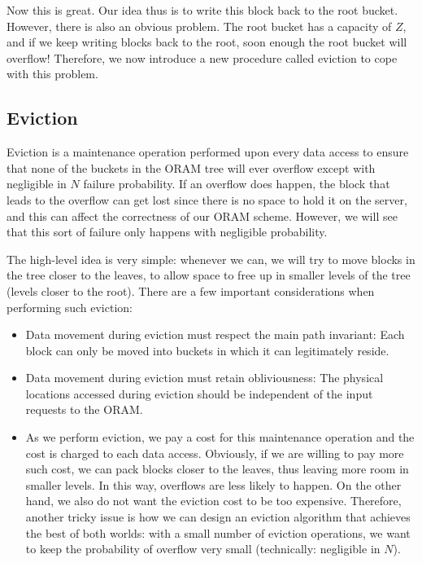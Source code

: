 Now this is great. Our idea thus is to write this block back to the root
bucket. However, there is also an obvious problem. The root bucket has a
capacity of $Z$, and if we keep writing blocks back to the root, soon
enough the root bucket will overflow! Therefore, we now introduce a new
procedure called \alert{eviction} to cope with this problem.

\subsection{Eviction}\label{eviction.}

Eviction is a maintenance operation performed upon every data access to
ensure that none of the buckets in the ORAM tree will ever overflow
except with negligible in $N$ failure probability. If an
overflow does happen, the block that leads to the overflow can get lost
since there is no space to hold it on the server, and this can affect
the correctness of our ORAM scheme. However, we will see that this sort of failure
only happens with negligible probability.

The high-level idea is very simple: whenever we can, we will try to move
blocks in the tree closer to the leaves, to allow space to free up in
smaller levels of the tree (levels closer to the root). There are a few
important considerations when performing such eviction:

\begin{itemize}
\item
  Data movement during eviction must respect the main path invariant:
  Each block can only be moved into buckets in which it can legitimately
  reside.
\item
  Data movement during eviction must retain \alert{obliviousness}: The
  physical locations accessed during eviction should be independent of
  the input requests to the ORAM.
\item
  As we perform eviction, we pay a cost for this maintenance operation
  and the cost is charged to each data access. Obviously, if we are
  willing to pay more such cost, we can pack blocks closer to the
  leaves, thus leaving more room in smaller levels. In this way,
  overflows are less likely to happen. On the other hand, we also do not
  want the eviction cost to be too expensive. Therefore, another tricky
  issue is how we can design an eviction algorithm that achieves the
  best of both worlds: with a small number of eviction operations, we
  want to keep the probability of overflow very small (technically:
  negligible in $N$).
\end{itemize}

